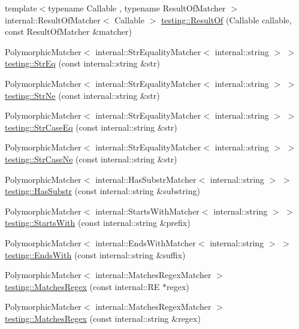 \begin{DoxyCompactItemize}
\item 
{\footnotesize template$<$typename Callable , typename Result\+Of\+Matcher $>$ }\\internal\+::\+Result\+Of\+Matcher$<$ Callable $>$ \hyperlink{namespacetesting_aaadb51dd383baa95f123ab891d4f8a5f}{testing\+::\+Result\+Of} (Callable callable, const Result\+Of\+Matcher \&matcher)
\item 
Polymorphic\+Matcher$<$ internal\+::\+Str\+Equality\+Matcher$<$ internal\+::string $>$ $>$ \hyperlink{namespacetesting_a154de81376ae7d584c6e5a619b45fb09}{testing\+::\+Str\+Eq} (const internal\+::string \&str)
\item 
Polymorphic\+Matcher$<$ internal\+::\+Str\+Equality\+Matcher$<$ internal\+::string $>$ $>$ \hyperlink{namespacetesting_a6f6b8af3d19cb969df0eb995c47a14d2}{testing\+::\+Str\+Ne} (const internal\+::string \&str)
\item 
Polymorphic\+Matcher$<$ internal\+::\+Str\+Equality\+Matcher$<$ internal\+::string $>$ $>$ \hyperlink{namespacetesting_addbdb8c0902ab09cade24fa6db7c0073}{testing\+::\+Str\+Case\+Eq} (const internal\+::string \&str)
\item 
Polymorphic\+Matcher$<$ internal\+::\+Str\+Equality\+Matcher$<$ internal\+::string $>$ $>$ \hyperlink{namespacetesting_a9596fd67bdd5df195bc54382f91a1906}{testing\+::\+Str\+Case\+Ne} (const internal\+::string \&str)
\item 
Polymorphic\+Matcher$<$ internal\+::\+Has\+Substr\+Matcher$<$ internal\+::string $>$ $>$ \hyperlink{namespacetesting_a7d27682e38d57eea81ba145a2772e1c7}{testing\+::\+Has\+Substr} (const internal\+::string \&substring)
\item 
Polymorphic\+Matcher$<$ internal\+::\+Starts\+With\+Matcher$<$ internal\+::string $>$ $>$ \hyperlink{namespacetesting_ae0502232432b1fe8361d296c6de6beda}{testing\+::\+Starts\+With} (const internal\+::string \&prefix)
\item 
Polymorphic\+Matcher$<$ internal\+::\+Ends\+With\+Matcher$<$ internal\+::string $>$ $>$ \hyperlink{namespacetesting_aec11c4e418a835ca2c0c3cbdb29b28ba}{testing\+::\+Ends\+With} (const internal\+::string \&suffix)
\item 
Polymorphic\+Matcher$<$ internal\+::\+Matches\+Regex\+Matcher $>$ \hyperlink{namespacetesting_a4dac232f315edc259b62ce88e413b107}{testing\+::\+Matches\+Regex} (const internal\+::\+RE $\ast$regex)
\item 
Polymorphic\+Matcher$<$ internal\+::\+Matches\+Regex\+Matcher $>$ \hyperlink{namespacetesting_afea6e0eaf0ae69b409fc1c0285df6c8c}{testing\+::\+Matches\+Regex} (const internal\+::string \&regex)

\end{DoxyCompactItemize}
